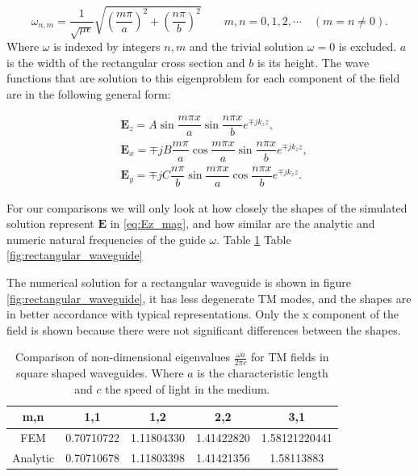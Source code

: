 \begin{equation}
\omega_{n,m} = \frac{1}{\sqrt{\mu\epsilon}}\sqrt{\left(\frac{m\pi}{a}\right)^2+\left(\frac{n\pi}{b}\right)^2}
\qquad m,n = 0,1,2,\cdots \quad (m=n\neq0).
\label{eq:eig_vals_sqare_waveguide}
\end{equation}
Where $\omega$ is indexed by integers $n,m$ and the trivial solution $\omega = 0$ is excluded. $a$ is the width of the rectangular cross section and $b$ is its height.
The wave functions that are solution to this eigenproblem for each component of the field are in the following general form:

\begin{align}
&\mathbf{E}_z = A\sin{\dfrac{m\pi x}{a}}\sin{\dfrac{n\pi x}{b}}e^{\mp jk_zz}, \label{eq:Ez_mag}\\
&\mathbf{E}_x =\mp jB\dfrac{m\pi}{a}\cos{\dfrac{m\pi x}{a}}\sin{\dfrac{n\pi x}{b}}e^{\mp jk_zz},\\
&\mathbf{E}_y =\mp jC\dfrac{n\pi}{b}\sin{\dfrac{m\pi x}{a}}\cos{\dfrac{n\pi x}{b}}e^{\mp jk_zz}.
\end{align}

For our comparisons we will only look at how closely the shapes of the simulated solution represent $\mathbf{E}$ in  \ref{eq:Ez_mag}, and how similar are the analytic and numeric  natural frequencies of the guide $\omega$.  Table \ref{tab:sq_wav_comparison}  Table \ref{fig:rectangular_waveguide} 

The numerical solution for a rectangular waveguide is shown in figure \ref{fig:rectangular_waveguide}, it has less degenerate TM modes, and the shapes are in better accordance with typical representations. Only the x component of the field is shown because there were not significant differences between the shapes.
\begin{table}
\begin{center}
\begin{tabular}{|c|c|c|c|c|}
\hline 
m,n & 1,1 & 1,2 & 2,2 & 3,1 \\ 
\hline 
FEM  & 0.70710722 &  1.11804330  &  1.41422820 & 1.58121220441 \\ 
\hline 
Analytic  & 0.70710678 &  1.11803398 &  1.41421356 &  1.58113883 \\
\hline 
\end{tabular} 
\caption{Comparison of non-dimensional eigenvalues $\frac{\omega a}{2\pi c}$ for TM fields in square shaped waveguides. Where $a$ is the characteristic length and $c$ the speed of light in the medium.}
\end{center}
\label{tab:sq_wav_comparison}
\end{table}



